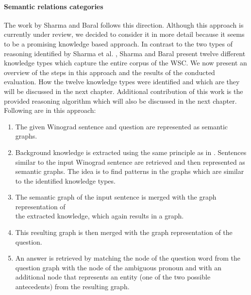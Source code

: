 \paragraph{Semantic relations categories}
The work by Sharma and Baral \cite{2018CommonsenseKT} follows this direction. Although this approach is currently under review, we decided to consider it in more detail because it seems to be a promising knowledge based approach. In contrast to the two types of reasoning identified by Sharma et al. \cite{DBLP:conf/ijcai/SharmaVAB15}, Sharma and Baral \cite{2018CommonsenseKT} present twelve different knowledge types which capture the entire corpus of the WSC. We now present an overview of the steps in this approach and the results of the conducted evaluation. How the twelve knowledge types were identified and which are they will be discussed in the next chapter. Additional contribution of this work is the provided reasoning algorithm which will also be discussed in the next chapter. 
 \\ Following are  in this approach: 
\begin{enumerate}
	\item The given Winograd sentence and question are represented as semantic graphs.
	\item Background knowledge is extracted using the same principle as in \cite{DBLP:conf/ijcai/SharmaVAB15}. Sentences similar to the input Winograd sentence are retrieved and then represented as semantic graphs. The idea is to find patterns in the graphs which are similar to the identified knowledge types. 
	\item The semantic graph of the input sentence is merged with the graph representation of \\
	 the extracted knowledge, which again results in a graph.
	\item This resulting graph is then merged with the graph representation of the question.
	\item An answer is retrieved by matching the node of the question word from the question graph with the node of the ambiguous pronoun and with an additional node that represents an entity (one of the two possible antecedents) from the resulting graph. 
\end{enumerate}


